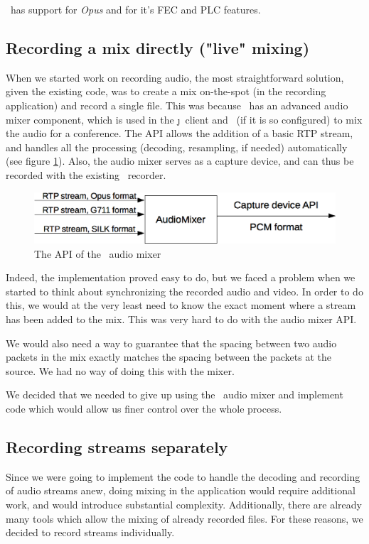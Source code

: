 \documentclass[twoside,openright,a4paper,12pt,english]{article}
\begin{document}
\lj\ has support for \emph{Opus} and for it's FEC and PLC features.


\subsection{Recording a mix directly ("live" mixing)}
When we started work on recording audio, the most straightforward solution,
given the existing code, was to create a mix on-the-spot (in the recording
application) and record a single file. This was because \lj\ has an advanced
audio mixer component, which is used in the \j\ client and \jvb\  (if it is so
configured) to mix the audio for a conference. The API allows the addition of a
basic RTP stream, and handles all the processing (decoding, resampling, if
needed) automatically (see figure \ref{audio-mixer}). Also, the audio mixer
serves as a capture device, and
can thus be recorded with the existing \lj\ recorder.

\begin{figure}[h]
    \includegraphics[width=13cm]{./pics/audio-mixer.eps}
    \caption{The API of the \lj\ audio mixer}
    \label{audio-mixer}
\end{figure}

Indeed, the implementation proved easy to do, but we faced a problem when we
started to think about synchronizing the recorded audio and video. In order to
do this, we would at the very least need to know the exact moment where a
stream has been added to the mix. This was very hard to do with the audio mixer
API.

We would also need a way to guarantee that the spacing between two audio
packets in the mix exactly matches the spacing between the packets at the
source. We had no way of doing this with the mixer.

We decided that we needed to give up using the \lj\ audio mixer and
implement code which would allow us finer control over the whole process.


\subsection{Recording streams separately}
Since we were going to implement the code to handle the decoding and recording
of audio streams anew, doing mixing in the application would require additional
work, and would introduce substantial complexity. Additionally, there are already
many tools which allow the mixing of already recorded files. For these reasons, we
decided to record streams individually.
\end{document}
